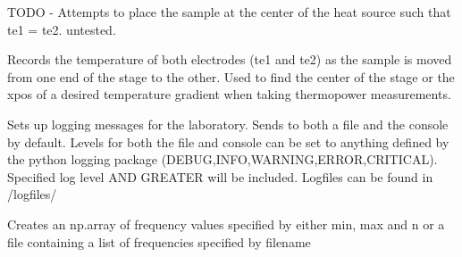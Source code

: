 \documentclass[letterpaper,10pt,english]{sphinxmanual}
\begin{document}

\begin{fulllineitems}
\label{\detokenize{utils:utils.find_center}}
TODO - Attempts to place the sample at the center of the heat source such that
te1 = te2. untested.

\end{fulllineitems}


\begin{fulllineitems}
\label{\detokenize{utils:utils.furnace_profile}}
Records the temperature of both electrodes (te1 and te2) as the sample is moved
from one end of the stage to the other. Used to find the center of the stage or the xpos of a desired temperature gradient when taking thermopower measurements.

\end{fulllineitems}


\begin{fulllineitems}
\label{\detokenize{utils:utils.lab_logger}}
Sets up logging messages for the laboratory. Sends to both a file and the console by default. Levels for both the file and console can be set to anything defined by the
python logging package (DEBUG,INFO,WARNING,ERROR,CRITICAL). Specified log level AND GREATER will be included. Logfiles can be found in /logfiles/

\end{fulllineitems}


\begin{fulllineitems}
\label{\detokenize{utils:utils.load_frequencies}}
Creates an np.array of frequency values specified by either min, max and n or a file containing a list of frequencies specified by filename

\end{fulllineitems}
\end{document}
